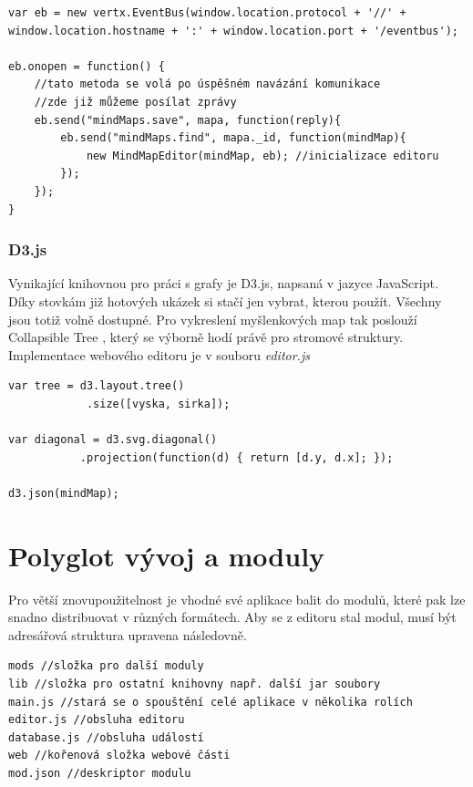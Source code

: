 \begin{lstlisting}[caption=Připojení Event busu z prohlížeče a inicializace editoru]
var eb = new vertx.EventBus(window.location.protocol + '//' + window.location.hostname + ':' + window.location.port + '/eventbus');

eb.onopen = function() {
	//tato metoda se volá po úspěšném navázání komunikace
	//zde již můžeme posílat zprávy
	eb.send("mindMaps.save", mapa, function(reply){
		eb.send("mindMaps.find", mapa._id, function(mindMap){
			new MindMapEditor(mindMap, eb); //inicializace editoru
		});	
	});
}
\end{lstlisting}

\subsubsection{D3.js}

Vynikající knihovnou pro práci s grafy je D3.js, napsaná v jazyce JavaScript. Díky stovkám již hotových ukázek si stačí jen vybrat, kterou použít. Všechny jsou totiž volně dostupné. Pro vykreslení myšlenkových map tak poslouží Collapsible Tree \cite{d3js}, který se výborně hodí právě pro stromové struktury. Implementace webového editoru je v souboru \emph{editor.js}

\begin{lstlisting}[caption=D3.js nicializace dat]
var tree = d3.layout.tree()
		    .size([vyska, sirka]);

var diagonal = d3.svg.diagonal()
		   .projection(function(d) { return [d.y, d.x]; });
		   
d3.json(mindMap);
\end{lstlisting}


\section{Polyglot vývoj a moduly}\label{sec:praktickyModuly}

Pro větší znovupoužitelnost je vhodné své aplikace balit do modulů, které pak lze snadno distribuovat v různých formátech. Aby se z editoru stal modul, musí být adresářová struktura upravena následovně.

\begin{lstlisting}
mods //složka pro další moduly
lib //složka pro ostatní knihovny např. další jar soubory
main.js //stará se o spouštění celé aplikace v několika rolích
editor.js //obsluha editoru
database.js //obsluha událostí 
web //kořenová složka webové části
mod.json //deskriptor modulu
\end{lstlisting}

